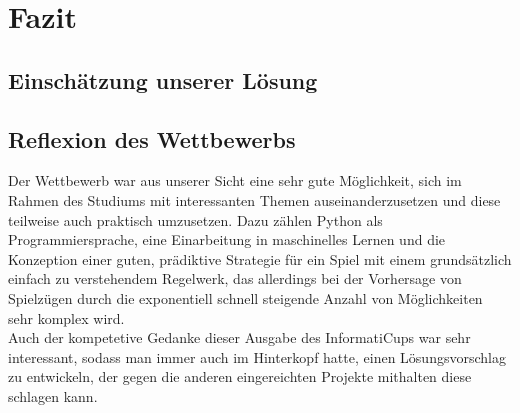 \chapter{Fazit}
\label{ch:fazit}

\section{Einschätzung unserer Lösung}
\label{sec:einschaetzuung}


\section{Reflexion des Wettbewerbs}
\label{sec:reflexion}

Der Wettbewerb war aus unserer Sicht eine sehr gute Möglichkeit, sich im Rahmen des Studiums mit interessanten Themen
auseinanderzusetzen und diese teilweise auch praktisch umzusetzen.
Dazu zählen \ua Python als Programmiersprache, eine Einarbeitung in maschinelles Lernen und die Konzeption einer
guten, prädiktive Strategie für ein Spiel mit einem grundsätzlich einfach zu verstehendem Regelwerk, das allerdings
bei der Vorhersage von Spielzügen durch die exponentiell schnell steigende Anzahl von Möglichkeiten sehr komplex wird.
\\

Auch der kompetetive Gedanke dieser Ausgabe des InformatiCups war sehr interessant, sodass man immer auch im
Hinterkopf hatte, einen Lösungsvorschlag zu entwickeln, der gegen die anderen eingereichten Projekte mithalten \bzw
diese schlagen kann.